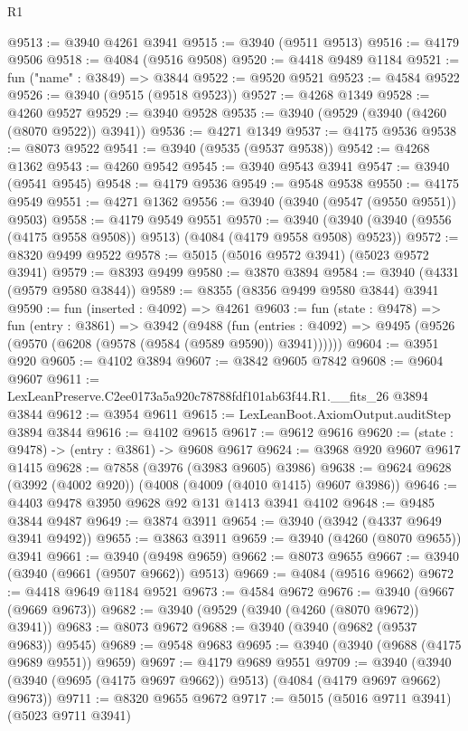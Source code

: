 \begin{lexlean}{R1}
\begin{coremodule}
@9513 := @3940 @4261 @3941
@9515 := @3940 (@9511 @9513)
@9516 := @4179 @9506
@9518 := @4084 (@9516 @9508)
@9520 := @4418 @9489 @1184
@9521 := fun ("name" : @3849) => @3844
@9522 := @9520 @9521
@9523 := @4584 @9522
@9526 := @3940 (@9515 (@9518 @9523))
@9527 := @4268 @1349
@9528 := @4260 @9527
@9529 := @3940 @9528
@9535 := @3940 (@9529 (@3940 (@4260 (@8070 @9522)) @3941))
@9536 := @4271 @1349
@9537 := @4175 @9536
@9538 := @8073 @9522
@9541 := @3940 (@9535 (@9537 @9538))
@9542 := @4268 @1362
@9543 := @4260 @9542
@9545 := @3940 @9543 @3941
@9547 := @3940 (@9541 @9545)
@9548 := @4179 @9536
@9549 := @9548 @9538
@9550 := @4175 @9549
@9551 := @4271 @1362
@9556 := @3940 (@3940 (@9547 (@9550 @9551)) @9503)
@9558 := @4179 @9549 @9551
@9570 := @3940 (@3940 (@3940 (@9556 (@4175 @9558 @9508)) @9513) (@4084 (@4179 @9558 @9508) @9523))
@9572 := @8320 @9499 @9522
@9578 := @5015 (@5016 @9572 @3941) (@5023 @9572 @3941)
@9579 := @8393 @9499
@9580 := @3870 @3894
@9584 := @3940 (@4331 (@9579 @9580 @3844))
@9589 := @8355 (@8356 @9499 @9580 @3844) @3941
@9590 := fun (inserted : @4092) => @4261
@9603 := fun (state : @9478) =>
  fun (entry : @3861) =>
  @3942
    (@9488
      (fun (entries : @4092) => @9495 (@9526 (@9570 (@6208 (@9578 (@9584 (@9589 @9590)) @3941))))))
@9604 := @3951 @920
@9605 := @4102 @3894
@9607 := @3842 @9605 @7842
@9608 := @9604 @9607
@9611 := LexLeanPreserve.C2ee0173a5a920c78788fdf101ab63f44.R1.__fits_26 @3894 @3844
@9612 := @3954 @9611
@9615 := LexLeanBoot.AxiomOutput.auditStep @3894 @3844
@9616 := @4102 @9615
@9617 := @9612 @9616
@9620 := (state : @9478) -> (entry : @3861) -> @9608 @9617
@9624 := @3968 @920 @9607 @9617 @1415
@9628 := @7858 (@3976 (@3983 @9605) @3986)
@9638 := @9624 @9628 (@3992 (@4002 @920)) (@4008 (@4009 (@4010 @1415) @9607 @3986))
@9646 := @4403 @9478 @3950 @9628 @92 @131 @1413 @3941 @4102
@9648 := @9485 @3844 @9487
@9649 := @3874 @3911
@9654 := @3940 (@3942 (@4337 @9649 @3941 @9492))
@9655 := @3863 @3911
@9659 := @3940 (@4260 (@8070 @9655)) @3941
@9661 := @3940 (@9498 @9659)
@9662 := @8073 @9655
@9667 := @3940 (@3940 (@9661 (@9507 @9662)) @9513)
@9669 := @4084 (@9516 @9662)
@9672 := @4418 @9649 @1184 @9521
@9673 := @4584 @9672
@9676 := @3940 (@9667 (@9669 @9673))
@9682 := @3940 (@9529 (@3940 (@4260 (@8070 @9672)) @3941))
@9683 := @8073 @9672
@9688 := @3940 (@3940 (@9682 (@9537 @9683)) @9545)
@9689 := @9548 @9683
@9695 := @3940 (@3940 (@9688 (@4175 @9689 @9551)) @9659)
@9697 := @4179 @9689 @9551
@9709 := @3940 (@3940 (@3940 (@9695 (@4175 @9697 @9662)) @9513) (@4084 (@4179 @9697 @9662) @9673))
@9711 := @8320 @9655 @9672
@9717 := @5015 (@5016 @9711 @3941) (@5023 @9711 @3941)

\end{coremodule}
\end{lexlean}
